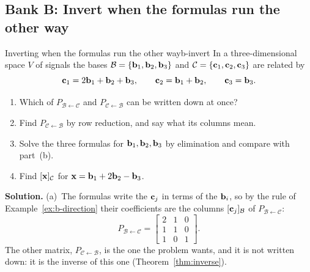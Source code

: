 \documentclass[11pt]{article}
\begin{document}
\subsection*{Bank B: Invert when the formulas run the other way}
\begin{exmp}{Inverting when the formulas run the other way}{b-invert}
In a three-dimensional space $V$ of signals the bases $\mathcal{B}=\{\mathbf{b}_1,\mathbf{b}_2,\mathbf{b}_3\}$ and $\mathcal{C}=\{\mathbf{c}_1,\mathbf{c}_2,\mathbf{c}_3\}$ are related by
\[
\mathbf{c}_1=2\mathbf{b}_1+\mathbf{b}_2+\mathbf{b}_3,\qquad \mathbf{c}_2=\mathbf{b}_1+\mathbf{b}_2,\qquad \mathbf{c}_3=\mathbf{b}_3.
\]
\begin{enumerate}
  \item[(a)] Which of $P_{\mathcal{B}\leftarrow\mathcal{C}}$ and $P_{\mathcal{C}\leftarrow\mathcal{B}}$ can be written down at once?
  \item[(b)] Find $P_{\mathcal{C}\leftarrow\mathcal{B}}$ by row reduction, and say what its columns mean.
  \item[(c)] Solve the three formulas for $\mathbf{b}_1,\mathbf{b}_2,\mathbf{b}_3$ by elimination and compare with part~(b).
  \item[(d)] Find $[\mathbf{x}]_{\mathcal{C}}$ for $\mathbf{x}=\mathbf{b}_1+2\mathbf{b}_2-\mathbf{b}_3$.
\end{enumerate}

\textbf{Solution.}
(a)~The formulas write the $\mathbf{c}_j$ in terms of the $\mathbf{b}_i$, so by the rule of Example~\ref{ex:b-direction} their coefficients are the columns $[\mathbf{c}_j]_{\mathcal{B}}$ of $P_{\mathcal{B}\leftarrow\mathcal{C}}$:
\[
P_{\mathcal{B}\leftarrow\mathcal{C}}=\begin{bmatrix}2&1&0\\1&1&0\\1&0&1\end{bmatrix}.
\]
The other matrix, $P_{\mathcal{C}\leftarrow\mathcal{B}}$, is the one the problem wants, and it is not written down: it is the inverse of this one (Theorem~\ref{thm:inverse}).


\end{exmp}
\end{document}
